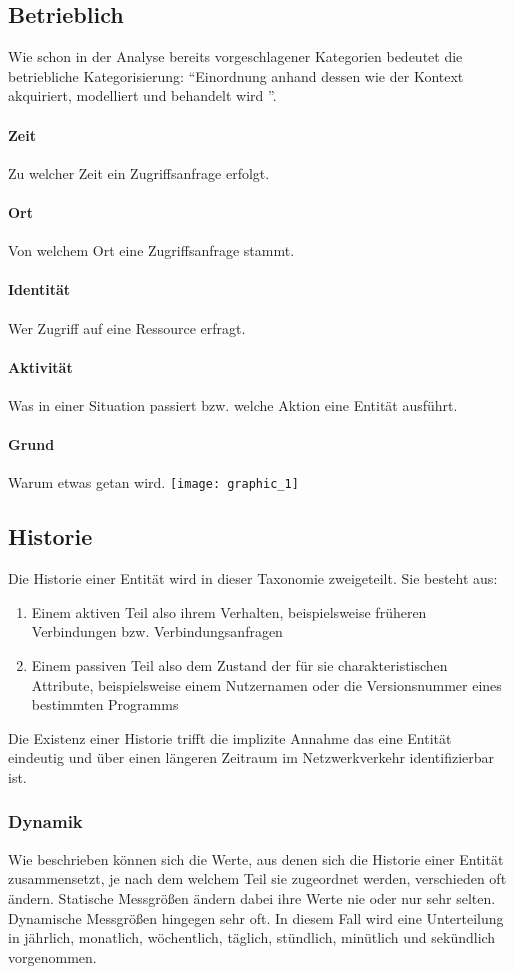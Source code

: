 \subsection{Betrieblich}
Wie schon in der Analyse bereits vorgeschlagener Kategorien bedeutet die betriebliche Kategorisierung: ``Einordnung anhand dessen wie der Kontext akquiriert, modelliert und behandelt wird ''.
\paragraph{Zeit}
Zu welcher Zeit ein Zugriffsanfrage erfolgt.
\paragraph{Ort}
Von welchem Ort eine Zugriffsanfrage stammt.
\paragraph{Identität}
Wer Zugriff auf eine Ressource erfragt.
\paragraph{Aktivität}
Was in einer Situation passiert bzw. welche Aktion eine Entität ausführt.
\paragraph{Grund}
Warum etwas getan wird.\linebreak
\texttt{[image: graphic\_1]}
\subsection{Historie}
Die Historie einer Entität wird in dieser Taxonomie zweigeteilt. Sie besteht aus:
\begin{enumerate}
\item{Einem aktiven Teil also ihrem Verhalten, beispielsweise früheren Verbindungen bzw. Verbindungsanfragen}
\item{Einem passiven Teil also dem Zustand der für sie charakteristischen Attribute, beispielsweise einem Nutzernamen oder die Versionsnummer eines bestimmten Programms}
\end{enumerate}
Die Existenz einer Historie trifft die implizite Annahme das eine Entität eindeutig und über einen längeren Zeitraum im Netzwerkverkehr identifizierbar ist.
\subsubsection{Dynamik}
Wie 
 beschrieben können sich die Werte, aus denen sich die Historie einer Entität zusammensetzt, je nach dem welchem Teil sie zugeordnet werden, verschieden oft ändern.
Statische Messgrößen ändern dabei ihre Werte nie oder nur sehr selten. Dynamische Messgrößen hingegen sehr oft. In diesem Fall wird eine Unterteilung in jährlich, monatlich, wöchentlich, täglich, stündlich, minütlich und sekündlich vorgenommen.
